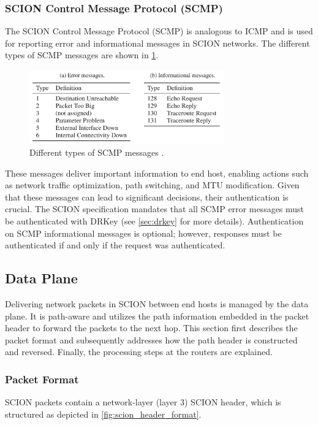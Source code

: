 \subsubsection{SCION Control Message Protocol (SCMP)}


The SCION Control Message Protocol (SCMP) is analogous to ICMP and is used for reporting error and informational messages in SCION networks.
The different types of SCMP messages are shown in \cref{fig:scmp_message_types}.

\begin{figure}[h]
    \centering
    \includegraphics[width=0.75\textwidth]{figures/scmp_message_types.png}
\caption{Different types of SCMP messages \cite[Section 4.7.2]{Perrig2022}.}
    \label{fig:scmp_message_types}
\end{figure}

These messages deliver important information to end host, enabling actions such as network traffic optimization, path switching, and MTU modification.
Given that these messages can lead to significant decisions, their authentication is crucial.
The SCION specification mandates that all SCMP error messages must be authenticated with DRKey (see \cref{sec:drkey} for more details).
Authentication on SCMP informational messages is optional; however, responses must be authenticated if and only if the request was authenticated.

\subsection{Data Plane}
Delivering network packets in SCION between end hosts is managed by the data plane.
It is path-aware and utilizes the path information embedded in the packet header to forward the packets to the next hop.
This section first describes the packet format and subsequently addresses how the path header is constructed and reversed.
Finally, the processing steps at the routers are explained.

\subsubsection{Packet Format}
SCION packets contain a network-layer (layer 3) SCION header, which is structured as depicted in \cref{fig:scion_header_format}.

